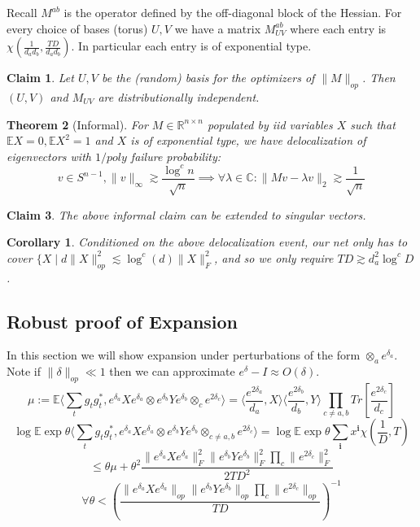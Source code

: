 \documentclass{article}
\newtheorem{theorem}{Theorem}
\newtheorem{corollary}{Corollary}
\newtheorem{claim}[theorem]{Claim}
\newcommand{\R}{{\mathbb{R}}}
\newcommand{\C}{{\mathbb{C}}}
\renewcommand{\vec}{\bm}
\newcommand{\E}{\mathbb{E}}
\begin{document}
Recall $M^{ab}$ is the operator defined by the off-diagonal block of the Hessian. For every choice of bases (torus) $U,V$ we have a matrix $M^{ab}_{UV}$ where each entry is $\chi(\frac{1}{d_{a}d_{b}}, \frac{TD}{d_{a}d_{b}})$. In particular each entry is of exponential type. 

\begin{claim}
Let $U,V$ be the (random) basis for the optimizers of $\|M\|_{op}$. Then $(U,V)$ and $M_{UV}$ are distributionally independent. 
\end{claim}

\begin{theorem} [Informal]
For $M \in \R^{n \times n}$ populated by iid variables $X$ such that $\E X = 0, \E X^{2} = 1$ and $X$ is of exponential type, we have delocalization of eigenvectors with $1/poly$ failure probability:
\[ v \in S^{n-1}, \|v\|_{\infty} \gtrsim \frac{\log^{c} n}{\sqrt{n}} \implies \forall \lambda \in \C: \|Mv - \lambda v\|_{2} \gtrsim \frac{1}{\sqrt{n}}   \]
\end{theorem}


\begin{claim}
The above informal claim can be extended to singular vectors. 
\end{claim}

\begin{corollary}
Conditioned on the above delocalization event, our net only has to cover $\{X \mid d \|X\|_{op}^{2} \lesssim \log^{c}(d) \|X\|_{F}^{2}$, and so we only require $TD \gtrsim d_{a}^{2} \log^{c} D$.
\end{corollary}


\subsection{Robust proof of Expansion}
In this section we will show expansion under perturbations of the form $\otimes_{a} e^{\delta_{a}}$. Note if $\|\delta\|_{op} \ll 1$ then we can approximate $e^{\delta} - I \approx O(\delta)$. 
\[ \mu := \E \langle \sum_{t} g_{t} g_{t}^{*}, e^{\delta_{a}} X e^{\delta_{a}} \otimes e^{\delta_{b}} Y e^{\delta_{b}} \otimes_{c} e^{2\delta_{c}} \rangle = \langle \frac{e^{2\delta_{a}}}{d_{a}} , X \rangle \langle \frac{e^{2\delta_{b}}}{d_{b}}, Y \rangle \prod_{c \neq a,b} Tr[\frac{e^{2\delta_{c}}}{d_{c}} ]  \]
\[ \log \E \exp \theta \langle \sum_{t} g_{t} g_{t}^{*}, e^{\delta_{a}} X e^{\delta_{a}} \otimes e^{\delta_{b}} Y e^{\delta_{b}} \otimes_{c \neq a,b} e^{2\delta_{c}} \rangle = \log \E \exp \theta \sum_{\vec{i}} x^{\vec{i}} \chi(\frac{1}{D},T)   \]
\[ \leq \theta \mu + \theta^{2} \frac{\|e^{\delta_{a}} X e^{\delta_{a}}\|_{F}^{2} \|e^{\delta_{b}} Y e^{\delta_{b}}\|_{F}^{2} \prod_{c} \|e^{2\delta_{c}}\|_{F}^{2}}{2 TD^{2}} \]
\[ \forall \theta < \left( \frac{\|e^{\delta_{a}} X e^{\delta_{a}}\|_{op} \|e^{\delta_{b}} Y e^{\delta_{b}}\|_{op} \prod_{c} \|e^{2\delta_{c}}\|_{op}}{TD} \right)^{-1}    \]
\end{document}
